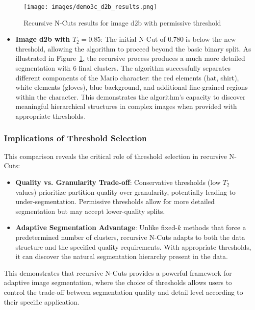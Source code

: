 \documentclass[12pt,a4paper]{article}
\begin{document}
{\begin{figure}[H]
    \centering
    \texttt{[image: images/demo3c\_d2b\_results.png]}
    \caption{Recursive N-Cuts results for image d2b with permissive threshold}
    \label{fig:demo3c_d2b}
\end{figure}

\begin{itemize}     
    \item \textbf{Image d2b with $T_2=0.85$}: The initial N-Cut of 0.780 is below the new threshold, allowing the algorithm to proceed beyond the basic binary split. As illustrated in Figure~\ref{fig:demo3c_d2b}, the recursive process produces a much more detailed segmentation with 6 final clusters. The algorithm successfully separates different components of the Mario character: the red elements (hat, shirt), white elements (gloves), blue background, and additional fine-grained regions within the character. This demonstrates the algorithm's capacity to discover meaningful hierarchical structures in complex images when provided with appropriate thresholds.
\end{itemize}



\subsubsection{Implications of Threshold Selection}

This comparison reveals the critical role of threshold selection in recursive N-Cuts:

\begin{itemize}
    \item \textbf{Quality vs. Granularity Trade-off}: Conservative thresholds (low $T_2$ values) prioritize partition quality over granularity, potentially leading to under-segmentation. Permissive thresholds allow for more detailed segmentation but may accept lower-quality splits.
        
    \item \textbf{Adaptive Segmentation Advantage}: Unlike fixed-$k$ methods that force a predetermined number of clusters, recursive N-Cuts adapts to both the data structure and the specified quality requirements. With appropriate thresholds, it can discover the natural segmentation hierarchy present in the data.    
\end{itemize}

This demonstrates that recursive N-Cuts provides a powerful framework for adaptive image segmentation, where the choice of thresholds allows users to control the trade-off between segmentation quality and detail level according to their specific application.






}
\end{document}
